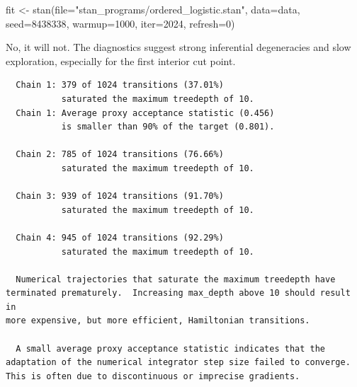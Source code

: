 \documentclass[
  letterpaper,
  DIV=11,
  numbers=noendperiod]{scrartcl}
\newenvironment{Shaded}{\begin{snugshade}}{\end{snugshade}}
\newcommand{\AttributeTok}[1]{\textcolor[rgb]{0.40,0.45,0.13}{#1}}
\newcommand{\DecValTok}[1]{\textcolor[rgb]{0.68,0.00,0.00}{#1}}
\newcommand{\FunctionTok}[1]{\textcolor[rgb]{0.28,0.35,0.67}{#1}}
\newcommand{\NormalTok}[1]{\textcolor[rgb]{0.00,0.23,0.31}{#1}}
\newcommand{\OtherTok}[1]{\textcolor[rgb]{0.00,0.23,0.31}{#1}}
\newcommand{\SpecialCharTok}[1]{\textcolor[rgb]{0.37,0.37,0.37}{#1}}
\newcommand{\StringTok}[1]{\textcolor[rgb]{0.13,0.47,0.30}{#1}}
\begin{document}
\begin{Shaded}
\begin{Highlighting}[]
\NormalTok{fit }\OtherTok{\textless{}{-}} \FunctionTok{stan}\NormalTok{(}\AttributeTok{file=}\StringTok{"stan\_programs/ordered\_logistic.stan"}\NormalTok{,}
            \AttributeTok{data=}\NormalTok{data, }\AttributeTok{seed=}\DecValTok{8438338}\NormalTok{,}
            \AttributeTok{warmup=}\DecValTok{1000}\NormalTok{, }\AttributeTok{iter=}\DecValTok{2024}\NormalTok{, }\AttributeTok{refresh=}\DecValTok{0}\NormalTok{)}
\end{Highlighting}
\end{Shaded}

No, it will not. The diagnostics suggest strong inferential degeneracies
and slow exploration, especially for the first interior cut point.

\begin{Shaded}
\end{Shaded}

\begin{verbatim}
  Chain 1: 379 of 1024 transitions (37.01%)
           saturated the maximum treedepth of 10.
  Chain 1: Average proxy acceptance statistic (0.456)
           is smaller than 90% of the target (0.801).

  Chain 2: 785 of 1024 transitions (76.66%)
           saturated the maximum treedepth of 10.

  Chain 3: 939 of 1024 transitions (91.70%)
           saturated the maximum treedepth of 10.

  Chain 4: 945 of 1024 transitions (92.29%)
           saturated the maximum treedepth of 10.

  Numerical trajectories that saturate the maximum treedepth have
terminated prematurely.  Increasing max_depth above 10 should result in
more expensive, but more efficient, Hamiltonian transitions.

  A small average proxy acceptance statistic indicates that the
adaptation of the numerical integrator step size failed to converge.
This is often due to discontinuous or imprecise gradients.
\end{verbatim}
\end{document}

